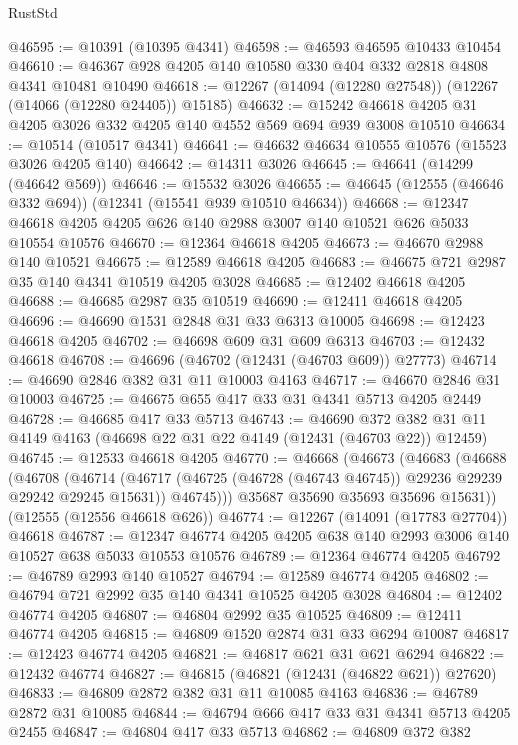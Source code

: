 \begin{lexlean}{RustStd}
\begin{coremodule}
@46595 := @10391 (@10395 @4341)
@46598 := @46593 @46595 @10433 @10454
@46610 := @46367 @928 @4205 @140 @10580 @330 @404 @332 @2818 @4808 @4341 @10481 @10490
@46618 := @12267 (@14094 (@12280 @27548)) (@12267 (@14066 (@12280 @24405)) @15185)
@46632 := @15242 @46618 @4205 @31 @4205 @3026 @332 @4205 @140 @4552 @569 @694 @939 @3008 @10510
@46634 := @10514 (@10517 @4341)
@46641 := @46632 @46634 @10555 @10576 (@15523 @3026 @4205 @140)
@46642 := @14311 @3026
@46645 := @46641 (@14299 (@46642 @569))
@46646 := @15532 @3026
@46655 := @46645 (@12555 (@46646 @332 @694)) (@12341 (@15541 @939 @10510 @46634))
@46668 := @12347 @46618 @4205 @4205 @626 @140 @2988 @3007 @140 @10521 @626 @5033 @10554 @10576
@46670 := @12364 @46618 @4205
@46673 := @46670 @2988 @140 @10521
@46675 := @12589 @46618 @4205
@46683 := @46675 @721 @2987 @35 @140 @4341 @10519 @4205 @3028
@46685 := @12402 @46618 @4205
@46688 := @46685 @2987 @35 @10519
@46690 := @12411 @46618 @4205
@46696 := @46690 @1531 @2848 @31 @33 @6313 @10005
@46698 := @12423 @46618 @4205
@46702 := @46698 @609 @31 @609 @6313
@46703 := @12432 @46618
@46708 := @46696 (@46702 (@12431 (@46703 @609)) @27773)
@46714 := @46690 @2846 @382 @31 @11 @10003 @4163
@46717 := @46670 @2846 @31 @10003
@46725 := @46675 @655 @417 @33 @31 @4341 @5713 @4205 @2449
@46728 := @46685 @417 @33 @5713
@46743 := @46690
    @372
    @382
    @31
    @11
    @4149
    @4163
    (@46698 @22 @31 @22 @4149 (@12431 (@46703 @22)) @12459)
@46745 := @12533 @46618 @4205
@46770 := @46668
    (@46673
      (@46683
        (@46688
          (@46708
            (@46714
              (@46717 (@46725 (@46728 (@46743 @46745)) @29236 @29239 @29242 @29245 @15631))
              @46745)))
        @35687
        @35690
        @35693
        @35696
        @15631))
    (@12555 (@12556 @46618 @626))
@46774 := @12267 (@14091 (@17783 @27704)) @46618
@46787 := @12347 @46774 @4205 @4205 @638 @140 @2993 @3006 @140 @10527 @638 @5033 @10553 @10576
@46789 := @12364 @46774 @4205
@46792 := @46789 @2993 @140 @10527
@46794 := @12589 @46774 @4205
@46802 := @46794 @721 @2992 @35 @140 @4341 @10525 @4205 @3028
@46804 := @12402 @46774 @4205
@46807 := @46804 @2992 @35 @10525
@46809 := @12411 @46774 @4205
@46815 := @46809 @1520 @2874 @31 @33 @6294 @10087
@46817 := @12423 @46774 @4205
@46821 := @46817 @621 @31 @621 @6294
@46822 := @12432 @46774
@46827 := @46815 (@46821 (@12431 (@46822 @621)) @27620)
@46833 := @46809 @2872 @382 @31 @11 @10085 @4163
@46836 := @46789 @2872 @31 @10085
@46844 := @46794 @666 @417 @33 @31 @4341 @5713 @4205 @2455
@46847 := @46804 @417 @33 @5713
@46862 := @46809
    @372
    @382

\end{coremodule}
\end{lexlean}
